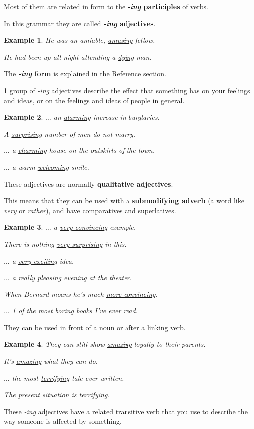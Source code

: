 \documentclass[oneside]{book}
\numberwithin{equation}{section}
\newtheorem{example}{Example}[section]
\begin{document}
Most of them are related in form to the \textbf{\textit{-ing} participles} of verbs.

In this grammar they are called \textbf{\textit{-ing} adjectives}.
\begin{example}
    He was an amiable, \underline{amusing} fellow.
    
    He had been up all night attending a \underline{dying} man.
\end{example}
The \textbf{\textit{-ing} form} is explained in the Reference section.

%
\noindent{} 1 group of \textit{-ing} adjectives describe the effect that something has on your feelings and ideas, or on the feelings and ideas of people in general.
\begin{example}
    $\ldots$ an \underline{alarming} increase in burglaries.
    
    A \underline{surprising} number of men do not marry.
    
    $\ldots$ a \underline{charming} house on the outskirts of the town.
    
    $\ldots$ a warm \underline{welcoming} smile.
\end{example}
%
\noindent{} These adjectives are normally \textbf{qualitative adjectives}.

This means that they can be used with a \textbf{submodifying adverb} (a word like \textit{very} or \textit{rather}), and have comparatives and superlatives.
\begin{example}
    $\ldots$ a \underline{very convincing} example.
    
    There is nothing \underline{very surprising} in this.
    
    $\ldots$ a \underline{very exciting} idea.
    
    $\ldots$ a \underline{really pleasing} evening at the theater.
    
    When Bernard moans he's much \underline{more convincing}.
    
    $\ldots$ 1 of \underline{the most boring} books I've ever read.
\end{example}
%
\noindent{} They can be used in front of a noun or after a linking verb.
\begin{example}
    They can still show \underline{amazing} loyalty to their parents.
    
    It's \underline{amazing} what they can do.
    
    $\ldots$ the most \underline{terrifying} tale ever written.
    
    The present situation is \underline{terrifying}.
\end{example}
%
\noindent{} These \textit{-ing} adjectives have a related transitive verb that you use to describe the way someone is affected by something.
\end{document}
